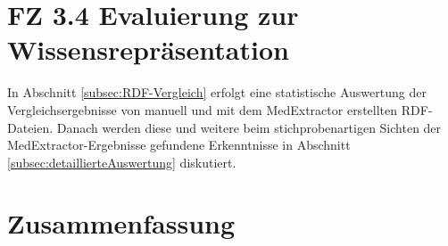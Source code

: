 \section{FZ 3.4 Evaluierung zur Wissensrepräsentation}
\label{sec:FZ3.4} 
In Abschnitt \ref{subsec:RDF-Vergleich} erfolgt eine statistische Auswertung der Vergleichsergebnisse von manuell und mit dem MedExtractor erstellten RDF-Dateien. Danach werden diese und weitere beim stichprobenartigen Sichten der MedExtractor-Ergebnisse gefundene Erkenntnisse in Abschnitt \ref{subsec:detaillierteAuswertung} diskutiert.










\section{Zusammenfassung}
\label{sec:zusammenfassung_evaluierung} 

